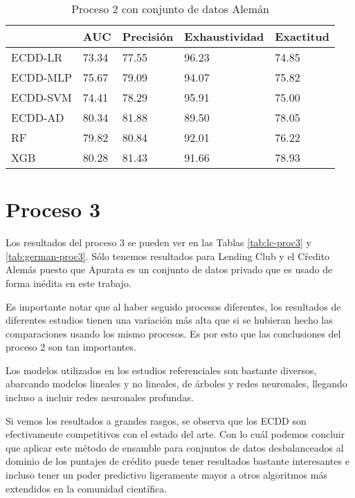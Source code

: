 \begin{table}[]
\centering
\caption{Proceso 2 con conjunto de datos Alemán}
\label{tab:german-proc2}
\begin{tabularx}{0.75\textwidth}{|l|Y Y Y Y|}
				\hline
				& AUC		& Precisión	& Exhaustividad	& Exactitud	\\
				\hline
ECDD-LR			& 73.34		& 77.55		& 96.23			& 74.85		\\
ECDD-MLP		& 75.67		& 79.09		& 94.07			& 75.82		\\
ECDD-SVM		& 74.41		& 78.29		& 95.91			& 75.00		\\
ECDD-AD			& 80.34		& 81.88		& 89.50			& 78.05		\\
				\hline
RF				& 79.82		& 80.84		& 92.01			& 76.22		\\
XGB				& 80.28		& 81.43		& 91.66			& 78.93		\\
				\hline
\end{tabularx}
\end{table}


\section{Proceso 3} %

Los resultados del proceso 3 se pueden ver en las Tablas \ref{tab:lc-proc3} y \ref{tab:german-proc3}. Sólo tenemos resultados para Lending Club y el Cŕedito Alemás puesto que Apurata es un conjunto de datos privado que es usado de forma inédita en este trabajo.

Es importante notar que al haber seguido procesos diferentes, los resultados de diferentes estudios tienen una variación más alta que si se hubieran hecho las comparaciones usando los mismo procesos. Es por esto que las conclusiones del proceso 2 son tan importantes.

Los modelos utilizados en los estudios referenciales son bastante diversos, abarcando modelos lineales y no lineales, de árboles y redes neuronales, llegando incluso a incluir redes neuronales profundas.

Si vemos los resultados a grandes rasgos, se observa que los \ac{ECDD} son efectivamente competitivos con el estado del arte. Con lo cuál podemos concluir que aplicar este método de ensamble para conjuntos de datos desbalanceados al dominio de los puntajes de crédito puede tener resultados bastante interesantes e incluso tener un poder predictivo ligeramente mayor a otros algoritmos más extendidos en la comunidad científica.


